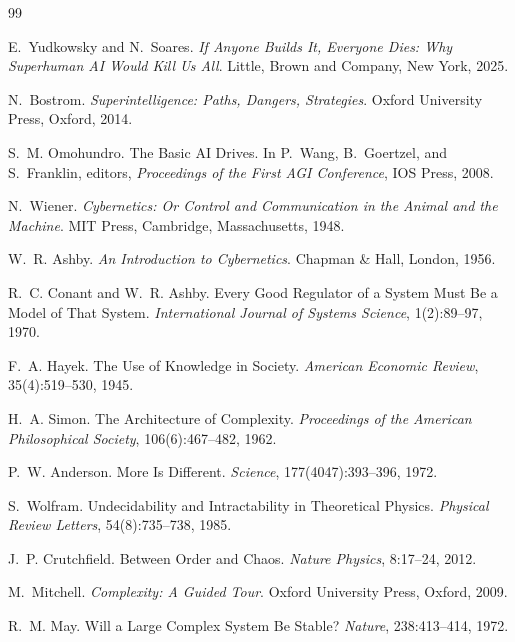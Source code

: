 \documentclass[11pt]{article}
\begin{document}
\begin{thebibliography}{99}

E.~Yudkowsky and N.~Soares.
\newblock \emph{If Anyone Builds It, Everyone Dies: Why Superhuman AI Would Kill Us All}.
\newblock Little, Brown and Company, New York, 2025.

N.~Bostrom.
\newblock \emph{Superintelligence: Paths, Dangers, Strategies}.
\newblock Oxford University Press, Oxford, 2014.

S.~M. Omohundro.
\newblock The Basic AI Drives.
\newblock In P.~Wang, B.~Goertzel, and S.~Franklin, editors,
\emph{Proceedings of the First AGI Conference}, IOS Press, 2008.

N.~Wiener.
\newblock \emph{Cybernetics: Or Control and Communication in the Animal
and the Machine}.
\newblock MIT Press, Cambridge, Massachusetts, 1948.

W.~R. Ashby.
\newblock \emph{An Introduction to Cybernetics}.
\newblock Chapman \& Hall, London, 1956.

R.~C. Conant and W.~R. Ashby.
\newblock Every Good Regulator of a System Must Be a Model of That System.
\newblock \emph{International Journal of Systems Science},
1(2):89--97, 1970.

F.~A. Hayek.
\newblock The Use of Knowledge in Society.
\newblock \emph{American Economic Review}, 35(4):519--530, 1945.

H.~A. Simon.
\newblock The Architecture of Complexity.
\newblock \emph{Proceedings of the American Philosophical Society},
106(6):467--482, 1962.

P.~W. Anderson.
\newblock More Is Different.
\newblock \emph{Science}, 177(4047):393--396, 1972.

S.~Wolfram.
\newblock Undecidability and Intractability in Theoretical Physics.
\newblock \emph{Physical Review Letters}, 54(8):735--738, 1985.

J.~P. Crutchfield.
\newblock Between Order and Chaos.
\newblock \emph{Nature Physics}, 8:17--24, 2012.

M.~Mitchell.
\newblock \emph{Complexity: A Guided Tour}.
\newblock Oxford University Press, Oxford, 2009.

R.~M. May.
\newblock Will a Large Complex System Be Stable?
\newblock \emph{Nature}, 238:413--414, 1972.


\end{thebibliography}
\end{document}
